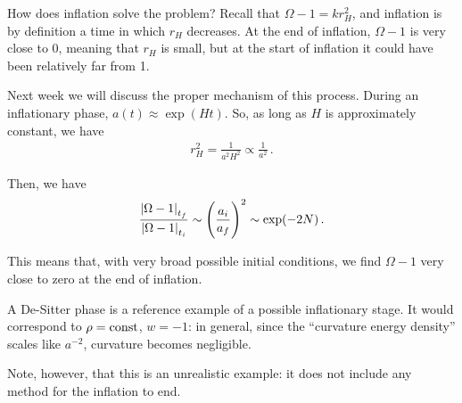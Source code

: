 \documentclass[main.tex]{subfiles}
\begin{document}
How does inflation solve the problem?
Recall that \(\Omega -1  = k r_H^2\), and inflation is by definition a time in which \(r_H\) decreases. 
At the end of inflation, \(\Omega - 1\) is very close to 0, meaning that \(r_H\) is small, but at the start of inflation it could have been relatively far from 1. 

Next week we will discuss the proper mechanism of this process.
During an inflationary phase, \(a (t) \approx \exp(Ht)\). So, as long as \(H\) is approximately constant, we have
%
\begin{align}
r_H^2 = \frac{1}{a^2 H^2} \propto \frac{1}{a^2}
\,.
\end{align}

Then, we have 
%
\begin{align}
\frac{\abs{\Omega -1}_{t_f}}{\abs{\Omega - 1}_{t_i}} \sim \qty(\frac{a_i}{a_f})^{2} \sim \exp(- 2N)
\,.
\end{align}

This means that, with very broad possible initial conditions, we find \(\Omega -1\) very close to zero at the end of inflation. 

A De-Sitter phase is a reference example of a possible inflationary stage. 
It would correspond to \(\rho = \text{const}\), \(w = -1\): in general, since the ``curvature energy density'' scales like \(a^{-2}\), curvature becomes negligible. 

Note, however, that this is an unrealistic example: it does not include any method for the inflation to end. 
\end{document}
